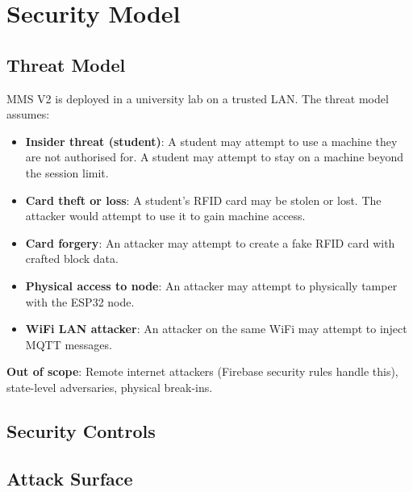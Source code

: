 \chapter{Security Model}
\label{ch:security}

\section{Threat Model}

MMS V2 is deployed in a university lab on a trusted LAN. The threat model assumes:

\begin{itemize}[leftmargin=1.5em]
    \item \textbf{Insider threat (student)}: A student may attempt to use a machine they are not authorised for. A student may attempt to stay on a machine beyond the session limit.
    \item \textbf{Card theft or loss}: A student's RFID card may be stolen or lost. The attacker would attempt to use it to gain machine access.
    \item \textbf{Card forgery}: An attacker may attempt to create a fake RFID card with crafted block data.
    \item \textbf{Physical access to node}: An attacker may attempt to physically tamper with the ESP32 node.
    \item \textbf{WiFi LAN attacker}: An attacker on the same WiFi may attempt to inject MQTT messages.
\end{itemize}

\textbf{Out of scope}: Remote internet attackers (Firebase security rules handle this), state-level adversaries, physical break-ins.

\section{Security Controls}

\section{Attack Surface}

